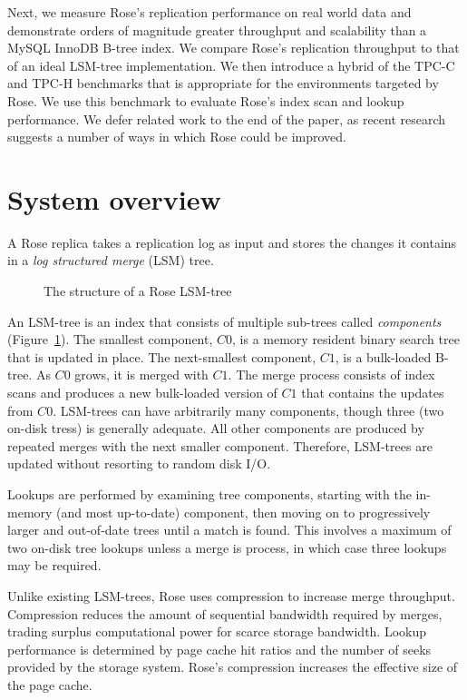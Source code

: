 \documentclass{vldb}
\newcommand{\rows}{Rose\xspace}
\newcommand{\rowss}{Rose's\xspace}
\begin{document}
Next, we measure \rowss replication performance on real world data and
demonstrate orders of magnitude greater throughput and scalability
than a MySQL InnoDB B-tree index.  We compare \rowss replication
throughput to that of an ideal LSM-tree implementation.  We then
introduce a hybrid of the TPC-C and TPC-H benchmarks that is
appropriate for the environments targeted by \rows.  We use this
benchmark to evaluate \rowss index scan and lookup performance.  We
defer related work to the end of the paper, as recent research
suggests a number of ways in which \rows could be improved.

\section{System overview}

A \rows replica takes a replication log as input and stores the
changes it contains in a {\em log structured merge} (LSM)
tree\cite{lsm}.
\begin{figure}
\centering {}
\caption{The structure of a \rows LSM-tree}
\label{fig:lsm-tree}
\end{figure}
An LSM-tree is an index that consists of multiple sub-trees called
{\em components} (Figure~\ref{fig:lsm-tree}).  The smallest component, $C0$, is a memory resident
binary search tree that is updated in place.  The next-smallest component, $C1$, is a bulk-loaded B-tree.  As $C0$ grows,
it is merged with $C1$.  The merge process consists of index scans
and produces a new bulk-loaded version of $C1$ that contains the
updates from $C0$.  LSM-trees can have arbitrarily many components,
though three (two on-disk tress) is generally adequate.
All other
components are produced by repeated merges with the next smaller
component.  Therefore, LSM-trees are updated without resorting to
random disk I/O.

Lookups are performed by examining tree components, starting with the
in-memory (and most up-to-date) component, then moving on
to progressively larger and out-of-date trees until a match is found.
This involves a maximum of two on-disk tree lookups unless a merge is
process, in which case three lookups may be required.

Unlike existing LSM-trees, \rows uses compression to increase merge
throughput.  Compression reduces the amount of sequential bandwidth
required by merges, trading surplus
computational power for scarce storage bandwidth.  Lookup performance
is determined by page cache hit ratios and the number of seeks
provided by the storage system.  \rowss compression increases the
effective size of the page cache.
\end{document}
